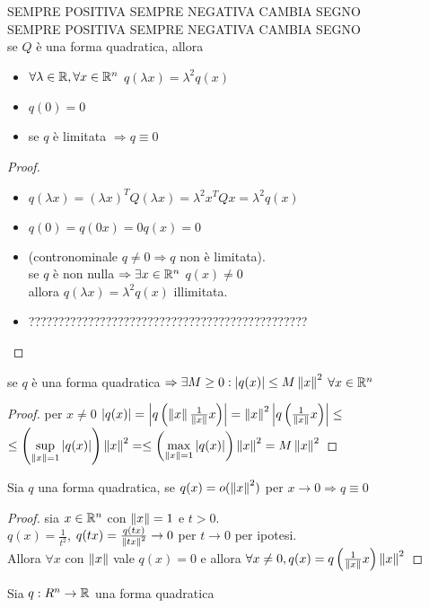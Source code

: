 SEMPRE POSITIVA SEMPRE NEGATIVA CAMBIA SEGNO\\
SEMPRE POSITIVA SEMPRE NEGATIVA CAMBIA SEGNO\\
\proposition
se $Q$ è una forma quadratica, allora\\
\begin{itemize}
	\item $\forall\lambda\in \mathbb{R}, \forall x\in \mathbb{R}^n$ $q(\lambda x)=\lambda^2q(x)$
	\item $q(0)=0$
	\item se $q$ è limitata $\Rightarrow q\equiv 0$ 
\end{itemize}
\begin{proof}
	\begin{itemize}
		\item $q(\lambda x)=(\lambda x)^TQ(\lambda x)=\lambda^2x^TQx=\lambda^2q(x)$
		\item $q(0)=q(0x)=0q(x)=0$
		\item (contronominale $q\ne 0 \Rightarrow q$ non è limitata).\\
		se $q$ è non nulla $\Rightarrow \exists x \in \mathbb{R}^n$ $q(x)\ne 0$\\
		allora $q(\lambda x)=\lambda^2q(x)$ illimitata.
		\item ???????????????????????????????????????????????
	\end{itemize}
\end{proof}
\proposition
se $q$ è una forma quadratica $\Rightarrow\exists M\ge 0: \left|q(x)\right|\le M\left\|x\right\|^2$ $\forall x\in \mathbb{R}^n$
\begin{proof}
	per $x\ne 0$ $\left|q(x)\right| =\left|q\left(\left\|x\right\| \frac{1}{\left\|x\right\| }x\right)\right| = \left\|x\right\|^2\left|q\left(\frac{1}{\left\|x\right\|}x\right)\right|\le$\\
	$\le\left(\sup\limits_{\left\|x\right\|=1}\left|q(x)\right|\right)\left\|x\right\|^2=\le\left(\max\limits_{\left\|x\right\|=1}\left|q(x)\right|\right)\left\|x\right\|^2=M\left\|x\right\|^2$
\end{proof}
\proposition
Sia $q$ una forma quadratica, se $q(x)=o(\left\|x\right\|^2)$ per $x\rightarrow 0 \Rightarrow q\equiv 0$
\begin{proof}
	sia $x\in \mathbb{R}^n$ con $\left\|x\right\|=1$ e $t>0$.\\
	$q(x)=\frac{1}{t^2}$, $q(tx)=\frac{q(tx)}{\left\|tx\right\|^2}\rightarrow 0$ per $t\rightarrow 0$ per ipotesi.\\
	Allora $\forall x$ con $\left\|x\right\|$ vale $q(x)=0$ e allora $\forall x\ne 0, q(x)=q\left(\frac{1}{\left\|x\right\|}x\right)\left\|x\right\|^2$
\end{proof}
Sia $q:R^n\rightarrow \mathbb{R}$ una forma quadratica\\
